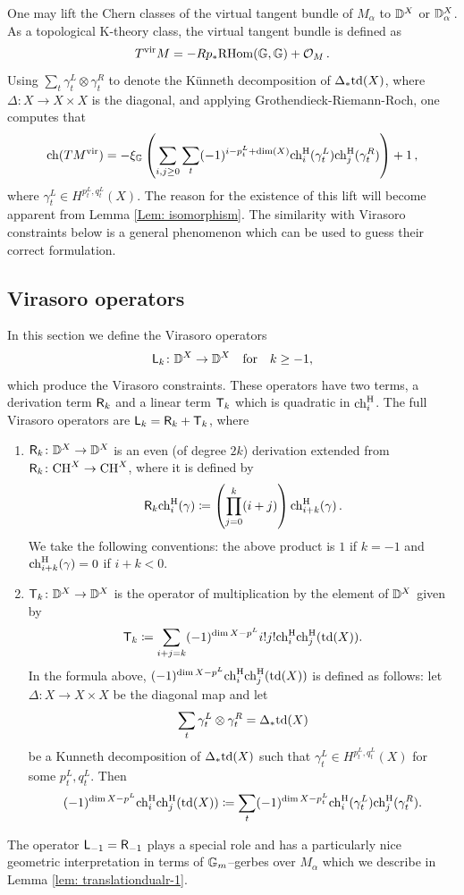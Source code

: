 \documentclass[a4paper, 12pt]{amsart}
\begin{document}
\begin{example}
\label{Ex: Tvir}
   One may lift the Chern classes of the virtual tangent bundle of $M_\alpha$ to ${\mathbb{D}}^X$ or ${\mathbb{D}}^X_{\alpha}$. As a topological K-theory class, the virtual tangent bundle is defined as 
$$
T^{\mathrm{vir}} M=-Rp_\ast\mathrm{RHom}({\mathbb{G}}, {\mathbb{G}}) + {\mathcal O}_M\,.
$$
 Using $\sum_{t}\gamma_t^L\otimes \gamma_t^R$ to denote the Künneth decomposition of $\Delta_{\ast} \mathrm{td}(X)$, where $\Delta\colon X\to X\times X$ is the diagonal, and applying Grothendieck-Riemann-Roch, one computes that
\begin{align*}
\mathrm{ch}(TM^{\mathrm{vir}})=-\xi_{\mathbb{G}}\left(\sum_{i,j\geq 0}\sum_t(-1)^{i-p_{t}^L+\dim(X)}\mathrm{ch}^{\mathrm{H}}_i(\gamma_t^L)\mathrm{ch}^{\mathrm{H}}_j(\gamma_t^R)\right)+1\,,
\end{align*}
where $\gamma_t^L\in H^{p_t^L, q_t^L}(X)$. The reason for the existence of this lift will become apparent from Lemma \ref{Lem: isomorphism}. The similarity with Virasoro constraints below is a general phenomenon which can be used to guess their correct formulation.
\end{example}



\subsection{Virasoro operators}

\label{sec: Virarosorops}

In this section we define the Virasoro operators 
\[{\mathsf{L}}_k\colon {\mathbb{D}}^X\to {\mathbb{D}}^X\quad\textnormal{for}\quad k\geq -1,\]which produce the Virasoro constraints. These operators have two terms, a derivation term $\mathsf{R}_k$ and a linear term ${\mathsf{T}}_k$ which is quadratic in $\mathrm{ch}^{\mathrm{H}}_i$. The full Virasoro operators are ${\mathsf{L}}_k=\mathsf{R}_k+{\mathsf{T}}_k$, where
\begin{enumerate}
\item 
$\mathsf{R}_k \colon {\mathbb{D}}^X\to {\mathbb{D}}^X$ is an even (of degree $2k$) derivation extended from $\mathsf{R}_k\colon \text{CH}^X\to\text{CH}^X$, where it is defined by
\[\mathsf{R}_k \mathrm{ch}^{\mathrm{H}}_i(\gamma)\coloneqq\left(\prod_{j=0}^k (i+j)\right)\mathrm{ch}^{\mathrm{H}}_{i+k}(\gamma)\,.\]
We take the following conventions: the above product is $1$ if $k=-1$ and $\mathrm{ch}^{\mathrm{H}}_{i+k}(\gamma)=0$ if $i+k<0$. 
\item ${\mathsf{T}}_k\colon {\mathbb{D}}^X\to {\mathbb{D}}^X$ is the operator of multiplication by the element of ${\mathbb{D}}^X$ given by
\[{\mathsf{T}}_k\coloneqq\sum_{i+j=k}(-1)^{\dim X-p^L}i!j!\mathrm{ch}^{\mathrm{H}}_i\mathrm{ch}^{\mathrm{H}}_j(\mathrm{td}(X)).\]
In the formula above, $(-1)^{\dim X-p^L}\mathrm{ch}^{\mathrm{H}}_i\mathrm{ch}^{\mathrm{H}}_j(\mathrm{td}(X))$ is defined as follows: let $\Delta\colon X\to X\times X$ be the diagonal map and let 
\[\sum_{t}\gamma_t^L\otimes \gamma_t^R=\Delta_\ast \mathrm{td}(X)\] 
be a Kunneth decomposition of  $\Delta_\ast\mathrm{td}(X)$ such that $\gamma_t^L\in H^{p^L_t, q^L_t}(X)$ for some $p_t^L, q_t^L$. Then 
\[(-1)^{\dim X-p^L}\mathrm{ch}^{\mathrm{H}}_i\mathrm{ch}^{\mathrm{H}}_j(\mathrm{td}(X))\coloneqq \sum_{t}(-1)^{\dim X-p_t^L}\mathrm{ch}^{\mathrm{H}}_i(\gamma_t^L)\mathrm{ch}^{\mathrm{H}}_j(\gamma_t^R).\]
\end{enumerate}
\begin{remark}
The operator ${\mathsf{L}}_{-1}=\mathsf{R}_{-1}$ plays a special role and has a particularly nice geometric interpretation in terms of ${\mathbb{G}}_m$--gerbes over $M_{\alpha}$ which we describe in Lemma \ref{lem: translationdualr-1}.
\end{remark}
\end{document}
